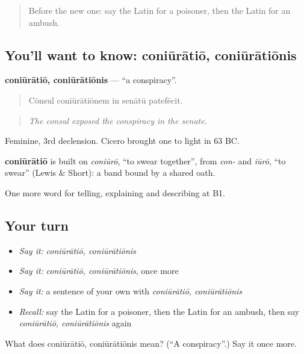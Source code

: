 \begin{quote}
Before the new one: say the Latin for a poisoner, then the Latin for an ambush.
\end{quote}

\subsection*{You'll want to know: coniūrātiō, coniūrātiōnis}
\textbf{coniūrātiō, coniūrātiōnis} — \textquotedblleft{}a conspiracy\textquotedblright{}.

\begin{quote}
Cōnsul coniūrātiōnem in senātū patefēcit.
\end{quote}

\begin{quote}
\emph{The consul exposed the conspiracy in the senate.}
\end{quote}

Feminine, 3rd declension. Cicero brought one to light in 63 BC.

\begin{cousinweb}
\textbf{coniūrātiō} is built on \emph{coniūrō}, \textquotedblleft{}to swear together\textquotedblright{}, from \emph{con-} and \emph{iūrō}, \textquotedblleft{}to swear\textquotedblright{} (Lewis \& Short): a band bound by a shared oath.
\end{cousinweb}

\begin{grammarlens}[title={What you've built}]
One more word for telling, explaining and describing at B1.
\end{grammarlens}

\subsection*{Your turn}
\begin{itemize}
\raggedright
  \item \emph{Say it:} \emph{coniūrātiō, coniūrātiōnis}
  \item \emph{Say it:} \emph{coniūrātiō, coniūrātiōnis}, once more
  \item \emph{Say it:} a sentence of your own with \emph{coniūrātiō, coniūrātiōnis}
  \item \emph{Recall:} say the Latin for a poisoner, then the Latin for an ambush, then say \emph{coniūrātiō, coniūrātiōnis} again
\end{itemize}

\begin{tcolorbox}[breakable,colback=teal!4,colframe=teal!35!black,title={Before you move on}]
What does coniūrātiō, coniūrātiōnis mean? (\textquotedblleft{}A conspiracy\textquotedblright{}.) Say it once more.
\end{tcolorbox}
